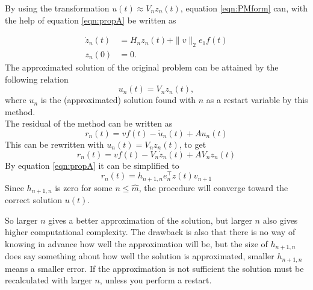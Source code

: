 By using the transformation $u(t) \approx V_n z_n(t)$, equation \eqref{eqn:PMform} can, with the help of equation \eqref{eqn:propA} be written as

\begin{equation}
\begin{aligned}
\dot{z}_n(t) &= H_n z_n(t) + \| v\|_2 e_1 f(t)  \\
z_n(0) &= 0.
\label{eqn:KPMi}
\end{aligned}
\end{equation}
The approximated solution of the original problem can be attained by the following relation
\begin{equation}
u_n(t) = V_n z_n(t),
\end{equation}
where $u_n$ is the (approximated) solution found with $n$ as a restart variable by this method. \\

The residual of the method can be written as
\begin{equation}
r_n(t) = v f(t) -\dot{u}_n(t) + A u_n(t)
\end{equation}
This can be rewritten with $u_n(t) = V_n z_n(t)$, to get
\begin{equation}
r_n(t) = v f(t) - V_n \dot{z}_n(t) + A V_n z_n(t)
\end{equation}
By equation \eqref{eqn:propA} it can be simplified to
\begin{equation}
r_n(t) = h_{n+1,n} e_n^\top z(t) v_{n+1}
\label{eqn:Aresidual}
\end{equation}
Since $h_{n+1,n}$ is zero for some $n \leq \hat{m}$, the procedure will converge toward the correct solution $u(t)$.

So larger $n$ gives a better approximation of the solution, but larger $n$ also gives higher computational complexity. The drawback is also that there is no way of knowing in advance how well the approximation will be, but the size of $h_{n+1,n}$ does say something about how well the solution is approximated, smaller $h_{n+1,n}$ means a smaller error. If the approximation is not sufficient the solution must be recalculated with larger $n$, unless you perform a restart. \\



